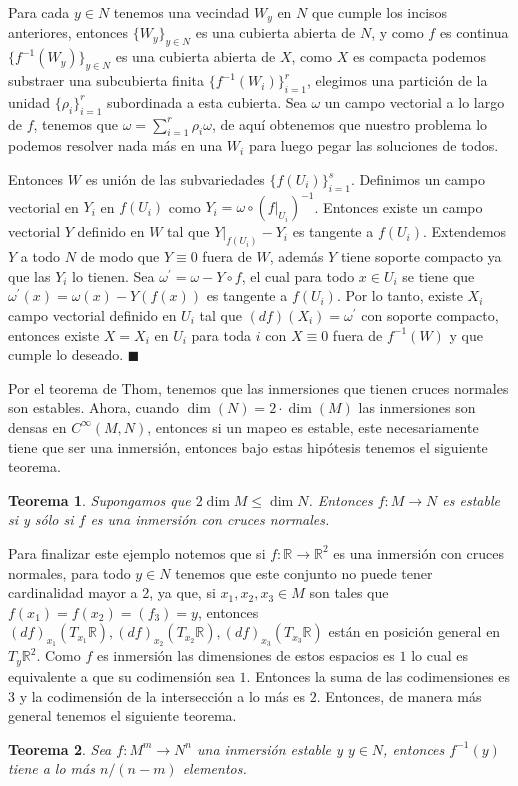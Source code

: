 \documentclass{report}
\newtheorem{theorem}{Teorema}[section]
\theoremstyle{definition}
\begin{document}
Para cada $y \in N$ tenemos una vecindad $W_y$ en $N$ que cumple los incisos anteriores, entonces $\{ W_y \}_{y \in N}$ es una cubierta abierta de $N$, y como $f$ es continua $\{ f^{-1} (W_y) \}_{y \in N}$ es una cubierta abierta de $X$, como $X$ es compacta podemos substraer una subcubierta finita $\{ f^{-1} (W_i) \}_{i=1}^r$, elegimos una partici\'on de la unidad $\{ \rho_i \}_{i=1}^r$ subordinada a esta cubierta. Sea $\omega$ un campo vectorial a lo largo de $f$, tenemos que $\omega= \sum\limits_{i=1}^r \rho_i \omega$, de aqu\'i obtenemos que nuestro problema lo podemos resolver nada m\'as en una $W_i$ para luego pegar las soluciones de todos.

Entonces $W$ es uni\'on de las subvariedades $ \{ f(U_i)\}_{i=1}^s$. Definimos un campo vectorial en $Y_i$ en $f(U_i)$ como $Y_i = \omega \circ (f\vert_{U_i} )^{-1}$. Entonces existe un campo vectorial $Y$ definido en $W$ tal que $Y \vert_{f(U_i)} - Y_i$ es tangente a $f(U_i)$. Extendemos $Y$ a todo $N$ de modo que $Y \equiv 0$ fuera de $W$, adem\'as $Y$ tiene soporte compacto ya que las $Y_i$ lo tienen. Sea $\omega^\prime = \omega - Y \circ f$, el cual para todo $x \in U_i$ se tiene que $\omega^\prime (x) = \omega(x) - Y (f(x))$ es tangente a $f(U_i)$. Por lo tanto, existe $X_i$ campo vectorial definido en $U_i$ tal que $(df) (X_i) = \omega^\prime$ con soporte compacto, entonces existe $X = X_i$ en $U_i$ para toda $i$ con $X\equiv 0$ fuera de $f^{-1} (W)$ y que cumple lo deseado. $\blacksquare$

Por el teorema de Thom, tenemos que las inmersiones que tienen cruces normales son estables. Ahora, cuando $\dim(N) = 2 \cdot \dim(M)$ las inmersiones son densas en $C^\infty (M,N)$, entonces si un mapeo es estable, este necesariamente tiene que ser una inmersi\'on, entonces bajo estas hip\'otesis tenemos el siguiente teorema.

\begin{theorem}
Supongamos que $2 \dim M \leq \dim N  $. Entonces $f:M \to N$ es estable si y s\'olo si $f$ es una inmersi\'on con cruces normales.
\end{theorem}

Para finalizar este ejemplo notemos que si $f: \mathbb{R} \to \mathbb{R}^2$ es una inmersi\'on con cruces normales, para todo $y \in N$ tenemos que este conjunto no puede tener cardinalidad mayor a 2, ya que, si $x_1, x_2 , x_3 \in M$ son tales que $f(x_1) = f(x_2) = (f_3) =y$, entonces $(df)_{x_1}(T_{x_1} \mathbb{R}) , (df)_{x_2} (T_{x_2} \mathbb{R}) , (df)_{x_3} (T_{x_3} \mathbb{R})$ est\'an en posici\'on general en $T_y \mathbb{R}^2$. Como $f$ es inmersi\'on las dimensiones de estos espacios es $1$ lo cual es equivalente a que su codimensi\'on sea $1$. Entonces la suma de las codimensiones es $3$ y la codimensi\'on de la intersecci\'on a lo m\'as es $2$. Entonces,  de manera m\'as general tenemos el siguiente teorema.
\begin{theorem}
Sea $f:M^m \to N^n$ una inmersi\'on estable y $y \in N$, entonces $f^{-1} (y)$ tiene a lo m\'as $n / (n-m) $ elementos.
\end{theorem}
\end{document}
